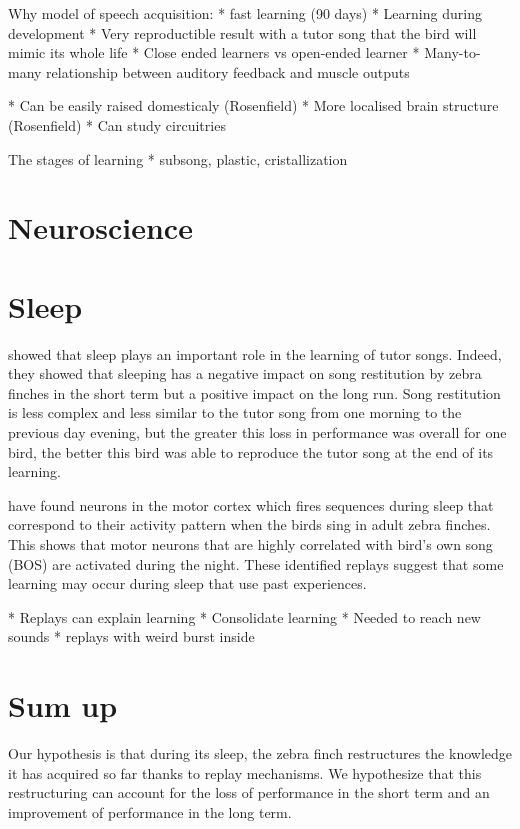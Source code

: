 \documentclass{report}
\begin{document}
Why model of speech acquisition:
* fast learning (90 days)
* Learning during development \cite{margoliash_offline_2003}
* Very reproductible result with a tutor song that the bird will mimic its whole
  life \cite{margoliash_sleep_2010}
    * Close ended learners vs open-ended learner \cite{margoliash_sleep_2010}
* Many-to-many relationship between auditory feedback and muscle outputs \cite{margoliash_offline_2003}

* Can be easily raised domesticaly (Rosenfield)
* More localised brain structure (Rosenfield)
    * Can study circuitries


The stages of learning
* subsong, plastic, cristallization \cite{margoliash_sleep_2010}


\section{Neuroscience}

\section{Sleep}
\textcite{deregnaucourt_how_2005} showed that sleep plays an important role in
the learning of tutor songs. Indeed, they showed that sleeping has a negative
impact on song restitution by zebra finches in the short term but a positive
impact on the long run. Song restitution is less complex and less similar to the
tutor song from one morning to the previous day evening, but the greater this
loss in performance was overall for one bird, the better this bird was able to
reproduce the tutor song at the end of its learning.

\textcite{dave_song_2000} have found neurons in the motor cortex which fires
sequences during sleep that correspond to their activity pattern when the birds
sing in adult zebra finches. This shows that motor neurons that are highly
correlated with bird's own song (BOS) are activated during the night. These
identified replays suggest that some learning may occur during sleep that use
past experiences.

* Replays can explain learning \cite{margoliash_offline_2003}
* Consolidate learning
* Needed to reach new sounds \cite{margoliash_offline_2003}
* replays with weird burst inside \cite{margoliash_evaluating_2002}

\section{Sum up}
Our hypothesis is that during its sleep, the zebra finch restructures the
knowledge it has acquired so far thanks to replay mechanisms. We hypothesize
that this restructuring can account for the loss of performance in the short
term and an improvement of performance in the long term.
\end{document}
